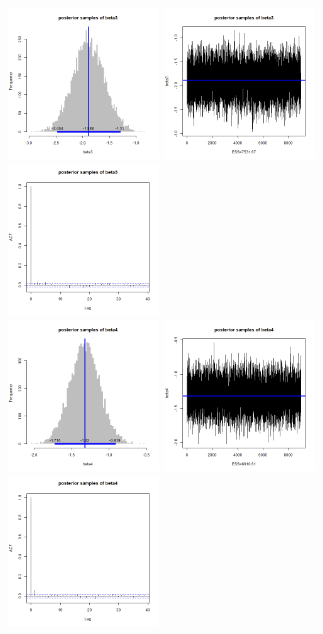 \documentclass{article}
\begin{document}
\begin{figure}[!h]
    \includegraphics[width=4cm]{beta3_hist.png}
    \includegraphics[width=4cm]{beta3_traceplot.png}
    \includegraphics[width=4cm]{beta3_acf.png} \\
    \includegraphics[width=4cm]{beta4_hist.png}
    \includegraphics[width=4cm]{beta4_traceplot.png}
    \includegraphics[width=4cm]{beta4_acf.png} \\

\end{figure}
\end{document}

